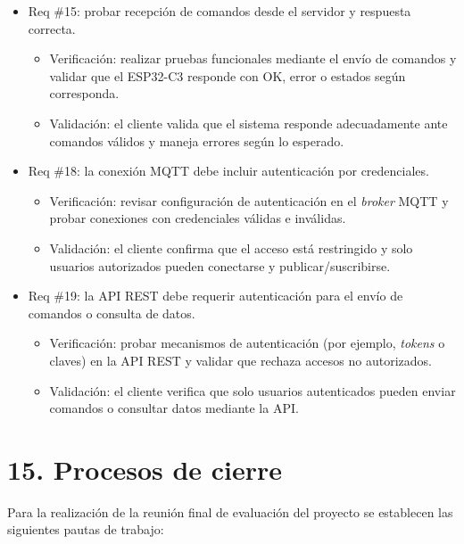 \documentclass[
11pt, %
]{charter}
\begin{document}
\begin{itemize}
\item Req \#15: probar recepción de comandos desde el servidor y respuesta correcta.

\begin{itemize}
	\item Verificación: realizar pruebas funcionales mediante el envío de comandos y validar que el ESP32-C3 responde con OK, error o estados según corresponda.
	\item Validación: el cliente valida que el sistema responde adecuadamente ante comandos válidos y maneja errores según lo esperado.
\end{itemize}

\item Req \#18: la conexión MQTT debe incluir autenticación por credenciales.

\begin{itemize}
	\item Verificación: revisar configuración de autenticación en el \textit{broker} MQTT y probar conexiones con credenciales válidas e inválidas.
	\item Validación: el cliente confirma que el acceso está restringido y solo usuarios autorizados pueden conectarse y publicar/suscribirse.
\end{itemize}

\item Req \#19: la API REST debe requerir autenticación para el envío de comandos o consulta de datos.

\begin{itemize}
	\item Verificación: probar mecanismos de autenticación (por ejemplo, \textit{tokens} o claves) en la API REST y validar que rechaza accesos no autorizados.
	\item Validación: el cliente verifica que solo usuarios autenticados pueden enviar comandos o consultar datos mediante la API.
\end{itemize}

\end{itemize}

\section{15. Procesos de cierre}    
\label{sec:cierre}
\label{sec:reunion-final}

Para la realización de la reunión final de evaluación del proyecto se establecen las siguientes pautas de trabajo:
\end{document}
